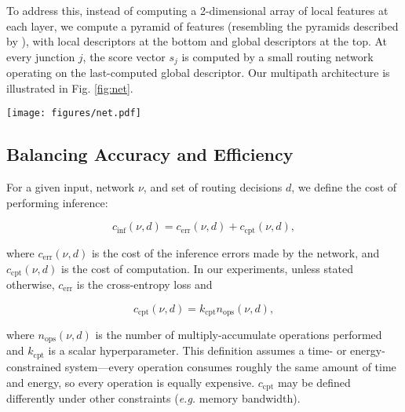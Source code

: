 \documentclass{article}
\begin{document}
  To address this, instead of computing a 2-dimensional array of local features at each layer, we compute a pyramid of features (resembling the pyramids described by \citet{ke2016neural}), with local descriptors at the bottom and global descriptors at the top. At every junction $j$, the score vector $s_j$ is computed by a small routing network operating on the last-computed global descriptor. Our multipath architecture is illustrated in Fig. \ref*{fig:net}.

  \begin{figure*}[tb]
    \centering
    \texttt{[image: figures/net.pdf]}
    \caption{\textbf{Our multiscale convolutional architecture.} Once a column is evaluated, the network decides whether to classify the image or evaluate subsequent columns. Deeper columns operate at coarser scales, but compute higher-dimensional representations at each location. All convolutions use 3$\times$3 kernels, downsampling is achieved via 2$\times$2 max pooling, and all routing layers have 16 channels.}
    \label{fig:net}
  \end{figure*}

  \subsection{Balancing Accuracy and Efficiency}
  
  For a given input, network $\nu$, and set of routing decisions $d$, we define the cost of performing inference:
  
  \begin{equation}
    c_\text{inf}(\nu,d) = c_\text{err}(\nu,d) + c_\text{cpt}(\nu,d),
  \end{equation}
  
  where $c_\text{err}(\nu,d)$ is the cost of the inference errors made by the network, and $c_\text{cpt}(\nu,d)$ is the cost of computation. In our experiments, unless stated otherwise, $c_\text{err}$ is the cross-entropy loss and
  
  \begin{equation}
    c_\text{cpt}(\nu,d) = k_\text{cpt} n_\text{ops}(\nu,d),
  \end{equation}
  
  where $n_\text{ops}(\nu,d)$ is the number of multiply-accumulate operations performed and $k_\text{cpt}$ is a scalar hyperparameter. This definition assumes a time- or energy-constrained system---every operation consumes roughly the same amount of time and energy, so every operation is equally expensive. $c_\text{cpt}$ may be defined differently under other constraints (\textit{e.g.} memory bandwidth).
\end{document}
